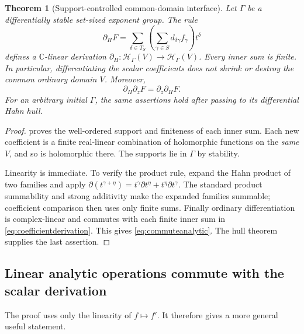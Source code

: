 \documentclass[11pt,a4paper]{article}
\newtheorem{theorem}{Theorem}[section]
\theoremstyle{definition}
\newcommand{\C}{\mathbb C}
\newcommand{\D}{\partial}
\newcommand{\HH}{\mathscr H}
\numberwithin{equation}{section}
\begin{document}
\begin{theorem}[Support-controlled common-domain interface]
\label{thm:analyticinterface}
Let $\Gamma$ be a differentially stable set-sized exponent group. The
rule
\begin{equation}\label{eq:coefficientderivation}
 \D_HF
 =\sum_{\delta\in T_S}
       \left(\sum_{\gamma\in S}d_{\delta\gamma}f_\gamma\right)t^\delta
\end{equation}
defines a $\C$-linear derivation
$\D_H:\HH_\Gamma(V)\to\HH_\Gamma(V)$.
Every inner sum is finite. In particular, differentiating the scalar
coefficients does not shrink or destroy the common ordinary domain $V$.
Moreover,
\begin{equation}\label{eq:commuteanalytic}
 \D_H\partial_zF=\partial_z\D_HF.
\end{equation}
For an arbitrary initial $\Gamma$, the same assertions hold after
passing to its differential Hahn hull.
\end{theorem}
\begin{proof}
 proves the well-ordered support and finiteness
of each inner sum. Each new coefficient is a finite real-linear
combination of holomorphic functions on the \emph{same} $V$, and so is
holomorphic there. The supports lie in $\Gamma$ by stability.

Linearity is immediate. To verify the product rule, expand the Hahn
product of two families and apply
$\D(t^{\gamma+\eta})=t^\gamma\D t^\eta+t^\eta\D t^\gamma$.
The standard product summability and strong additivity make the expanded
families summable; coefficient comparison then uses only finite sums.
Finally ordinary differentiation is complex-linear and commutes with each
finite inner sum in \eqref{eq:coefficientderivation}. This gives
\eqref{eq:commuteanalytic}. The hull theorem supplies the last assertion.
\end{proof}

\subsection{Linear analytic operations commute with the scalar derivation}
The proof uses only the linearity of $f\mapsto f'$. It therefore gives a
more general useful statement.
\end{document}
